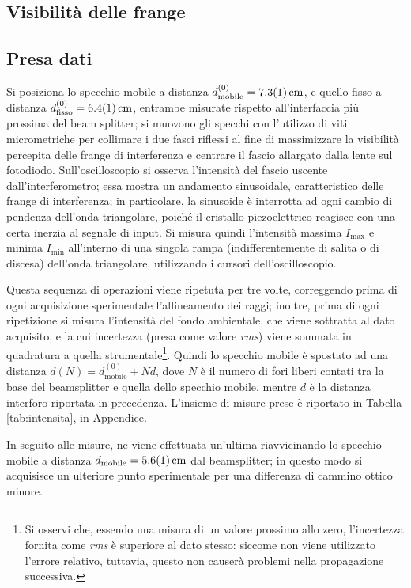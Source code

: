 \documentclass[10pt,oneside,a4paper]{article}
\begin{document}
\begin{multicols}{2}
\section{Visibilità delle frange}
\subsection{Presa dati}\label{sec:presa_dati}
Si posiziona lo specchio mobile a distanza $d^{(0)}_\mathrm{mobile} = \SI{7.3 \pm 0.1}{cm}$, e quello fisso a distanza $d^{(0)}_\mathrm{fisso} = \SI{6.4 \pm 0.1}{cm}$, entrambe misurate rispetto all'interfaccia più prossima del beam splitter; si muovono gli specchi con l'utilizzo di viti micrometriche per collimare i due fasci riflessi al fine di massimizzare la visibilità percepita delle frange di interferenza e centrare il fascio allargato dalla lente sul fotodiodo. Sull'oscilloscopio si osserva l'intensità del fascio uscente dall'interferometro; essa mostra un andamento sinusoidale, caratteristico delle frange di interferenza; in particolare, la sinusoide è interrotta ad ogni cambio di pendenza dell'onda triangolare, poiché il cristallo piezoelettrico reagisce con una certa inerzia al segnale di input. Si misura quindi l'intensità massima $I_\mathrm{max}$ e minima $I_\mathrm{min}$ all'interno di una singola rampa (indifferentemente di salita o di discesa) dell'onda triangolare, utilizzando i cursori dell'oscilloscopio. 

Questa sequenza di operazioni viene ripetuta per tre volte, correggendo prima di ogni acquisizione sperimentale l'allineamento dei raggi; inoltre, prima di ogni ripetizione si misura l'intensità del fondo ambientale, che viene sottratta al dato acquisito, e la cui incertezza (presa come valore \emph{rms}) viene sommata in quadratura a quella strumentale\footnote{Si osservi che, essendo una misura di un valore prossimo allo zero, l'incertezza fornita come \emph{rms} è superiore al dato stesso: siccome non viene utilizzato l'errore relativo, tuttavia, questo non causerà problemi nella propagazione successiva.}. Quindi lo specchio mobile è spostato ad una distanza $d(N) = d^{(0)}_\mathrm{mobile} + Nd$, dove $N$ è il numero di fori liberi contati tra la base del beamsplitter e quella dello specchio mobile, mentre $d$ è la distanza interforo riportata in precedenza.
L'insieme di misure prese è riportato in Tabella \ref{tab:intensita}, in Appendice.

In seguito alle misure, ne viene effettuata un'ultima riavvicinando lo specchio mobile a distanza $d_\mathrm{mobile} = \SI{5.6 \pm 0.1}{cm}$ dal beamsplitter; in questo modo si acquisisce un ulteriore punto sperimentale per una differenza di cammino ottico minore.


\end{multicols}
\end{document}
